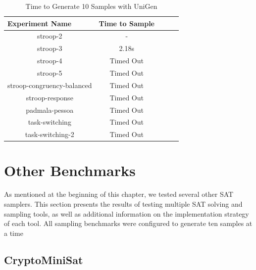 \begin{table}[b]
  \centering
  \caption{Time to Generate 10 Samples with UniGen}
\begin{tabular}{|c|c|c|c|c|}
\hline
\multicolumn{1}{|l|}{Experiment Name} & Time to Sample  \\ \hline
stroop-2                              & -               \\ \hline
stroop-3                              & 2.18s           \\ \hline
stroop-4                              & Timed Out       \\ \hline
stroop-5                              & Timed Out       \\ \hline
stroop-congruency-balanced            & Timed Out       \\ \hline
stroop-response                       & Timed Out       \\ \hline
padmala-pessoa                        & Timed Out       \\ \hline
task-switching                        & Timed Out       \\ \hline
task-switching-2                      & Timed Out       \\ \hline
\end{tabular}
\label{tab:benchmark_experiments_unigen}
\end{table}


\section{Other Benchmarks}

As mentioned at the beginning of this chapter, we tested several other SAT samplers. This section presents the results of testing multiple SAT solving and sampling tools, as well as additional information on the implementation strategy of each tool. All sampling benchmarks were configured to generate ten samples at a time

\subsection{CryptoMiniSat}

